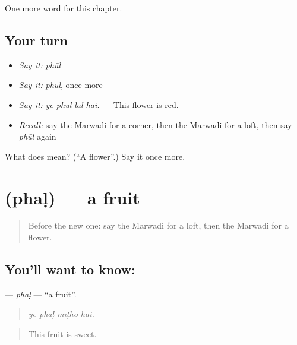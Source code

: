 \begin{grammarlens}[title={What you've built}]
One more word for this chapter.
\end{grammarlens}

\subsection*{Your turn}
\begin{itemize}
\raggedright
  \item \emph{Say it:} \emph{phūl}
  \item \emph{Say it:} \emph{phūl}, once more
  \item \emph{Say it:} \emph{ye phūl lāl hai.} — This flower is red.
  \item \emph{Recall:} say the Marwadi for a corner, then the Marwadi for a loft, then say \emph{phūl} again
\end{itemize}

\begin{tcolorbox}[breakable,colback=teal!4,colframe=teal!35!black,title={Before you move on}]
What does  mean? (\textquotedblleft{}A flower\textquotedblright{}.) Say it once more.
\end{tcolorbox}
\section[\texorpdfstring{\mw{फळ} (phaḷ)}{फळ (phaḷ)}]{ (phaḷ) — a fruit}

\label{lesson:MW-C188-phal}



\begin{quote}
Before the new one: say the Marwadi for a loft, then the Marwadi for a flower.
\end{quote}

\subsection*{You'll want to know: }
\textbf{} — \emph{phaḷ} — \textquotedblleft{}a fruit\textquotedblright{}.

\begin{quote}
   
\end{quote}

\begin{quote}
\emph{ye phaḷ mīṭho hai.}
\end{quote}

\begin{quote}
This fruit is sweet.
\end{quote}

